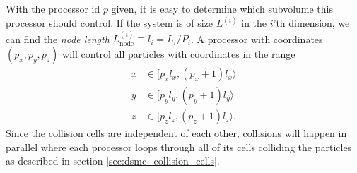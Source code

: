 With the processor id $p$ given, it is easy to determine which subvolume this processor should control. If the system is of size $L^{(i)}$ in the $i$'th dimension, we can find the \textit{node length} $L_{\text{node}}^{(i)} \equiv l_i = L_i/P_i$. A processor with coordinates $(p_x, p_y, p_z)$ will control all particles with coordinates in the range
\begin{align}
	\nonumber
	x&\in[p_xl_x, (p_x+1)l_x\rangle\\
	\nonumber
	y&\in[p_yl_y, (p_y+1)l_y\rangle\\
	z&\in[p_zl_z, (p_z+1)l_z\rangle.
\end{align}
Since the collision cells are independent of each other, collisions will happen in parallel where each processor loops through all of its cells colliding the particles as described in section \ref{sec:dsmc_collision_cells}. 
